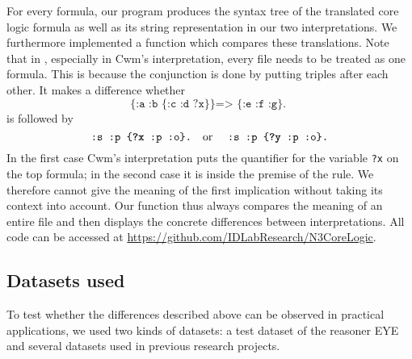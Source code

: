 For every \nthree formula, our program produces the syntax tree of the translated core logic formula as well as its string representation in our two 
interpretations.
We furthermore implemented a function which compares these translations. Note that in \nthree, 
especially in Cwm's interpretation, every file needs to be treated as one formula. This is because the conjunction is done by
putting triples after each other. It makes a difference whether 
\[
 \texttt{\{:a :b \{:c :d ?x\}\} => \{:e :f :g\}. }
\]
is followed by
\[
  \texttt{:s :p \{\textbf{?x} :p :o\}.} \text{\quad or \quad}  \texttt{:s :p \{\textbf{?y} :p :o\}.}
\]
In the first case Cwm's interpretation puts the quantifier for the variable \texttt{?x} on the top formula; in the second case it is inside the premise of the rule.
We therefore cannot give the meaning of the first implication without taking its context into account. Our function thus always 
compares the meaning of an entire file and then displays the concrete differences between interpretations. All code can be accessed at \url{https://github.com/IDLabResearch/N3CoreLogic}.




\subsection{Datasets used}\label{data}
To test whether the differences described above can be observed in practical applications,
we used two kinds of datasets: a test dataset of the reasoner 
EYE and several datasets used in previous research projects.

